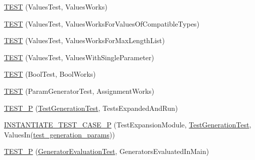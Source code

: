 \begin{DoxyCompactItemize}
\mbox{\hyperlink{_obj__test_2lib_2googletest-release-1_88_81_2googletest_2test_2googletest-param-test-test_8cc_ad859819e6b2a7ec58c4fd509b5cfc26c}{T\+E\+ST}} (Values\+Test, Values\+Works)
\item 
\mbox{\hyperlink{_obj__test_2lib_2googletest-release-1_88_81_2googletest_2test_2googletest-param-test-test_8cc_a079a199d832d0c61689193e9c9a4fd1a}{T\+E\+ST}} (Values\+Test, Values\+Works\+For\+Values\+Of\+Compatible\+Types)
\item 
\mbox{\hyperlink{_obj__test_2lib_2googletest-release-1_88_81_2googletest_2test_2googletest-param-test-test_8cc_a5d96d28bb6fd22c56222a4b358a8c65e}{T\+E\+ST}} (Values\+Test, Values\+Works\+For\+Max\+Length\+List)
\item 
\mbox{\hyperlink{_obj__test_2lib_2googletest-release-1_88_81_2googletest_2test_2googletest-param-test-test_8cc_af5c833610dcfcdfed7bcaa5f2e7dcf16}{T\+E\+ST}} (Values\+Test, Values\+With\+Single\+Parameter)
\item 
\mbox{\hyperlink{_obj__test_2lib_2googletest-release-1_88_81_2googletest_2test_2googletest-param-test-test_8cc_a3f3ae54fc86fcf5881329fb7e8e4b8ee}{T\+E\+ST}} (Bool\+Test, Bool\+Works)
\item 
\mbox{\hyperlink{_obj__test_2lib_2googletest-release-1_88_81_2googletest_2test_2googletest-param-test-test_8cc_aca8e985a9ed651999aed02287e9e67ba}{T\+E\+ST}} (Param\+Generator\+Test, Assignment\+Works)
\item 
\mbox{\hyperlink{_obj__test_2lib_2googletest-release-1_88_81_2googletest_2test_2googletest-param-test-test_8cc_a6c5cf7b74d0cec5d5170659d1d31b560}{T\+E\+S\+T\+\_\+P}} (\mbox{\hyperlink{class_test_generation_test}{Test\+Generation\+Test}}, Tests\+Expanded\+And\+Run)
\item 
\mbox{\hyperlink{_obj__test_2lib_2googletest-release-1_88_81_2googletest_2test_2googletest-param-test-test_8cc_ac76aec2b09390e1a1f8325a6ef2837fb}{I\+N\+S\+T\+A\+N\+T\+I\+A\+T\+E\+\_\+\+T\+E\+S\+T\+\_\+\+C\+A\+S\+E\+\_\+P}} (Test\+Expansion\+Module, \mbox{\hyperlink{class_test_generation_test}{Test\+Generation\+Test}}, Values\+In(\mbox{\hyperlink{_obj__test_2lib_2googletest-release-1_88_81_2googletest_2test_2googletest-param-test-test_8cc_aefe5c7eafc17e71cec010d92628bf84f}{test\+\_\+generation\+\_\+params}}))
\item 
\mbox{\hyperlink{_obj__test_2lib_2googletest-release-1_88_81_2googletest_2test_2googletest-param-test-test_8cc_afb359adcaa80d8d4de1a139e16ddbbcd}{T\+E\+S\+T\+\_\+P}} (\mbox{\hyperlink{class_generator_evaluation_test}{Generator\+Evaluation\+Test}}, Generators\+Evaluated\+In\+Main)

\end{DoxyCompactItemize}
